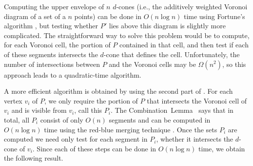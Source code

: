 \documentclass[lotsofwhite]{patmorin}
\begin{document}
Computing the upper envelope of $n$ $d$-cones (i.e., the additively
weighted Voronoi diagram of a set of a $n$ points) can be done in
$O(n\log n)$ time using Fortune's algorithm \cite{f87}, but testing
whether $P'$ lies above this diagram is slightly more complicated.
The straightforward way to solve this problem would be to compute, for
each Voronoi cell, the portion of $P$ contained in that cell, and then
test if each of these segments intersects the $d$-cone that defines
the cell. Unfortunately, the number of intersections between $P$ and
the Voronoi cells may be $\Omega(n^2)$, so this approach leads to a
quadratic-time algorithm.

A more efficient algorithm is obtained by using the second part of
.  For each vertex $v_i$ of $P$, we only require
the portion of $P$ that intersects the Voronoi cell of $v_i$ and is
visible from $v_i$, call this $P_i$.  The
Combination~Lemma~\cite{gss89,sa95} says that in total, all $P_i$
consist of only $O(n)$ segments and can be computed in $O(n\log n)$
time using the red-blue merging technique \cite{sa95}.  Once the sets
$P_i$ are computed we need only test for each segment in $P_i$,
whether it intersects the $d$-cone of $v_i$. Since each of these steps
can be done in $O(n\log n)$ time, we obtain the following result.
\end{document}

